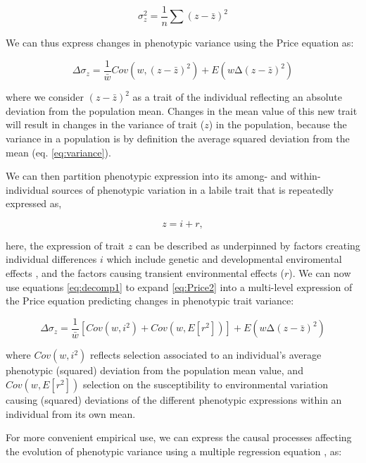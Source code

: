 \documentclass{article}
\begin{document}
\begin{equation} \label{eq:variance}
\sigma^{2}_{z} = \frac{1}{n} \sum{(z-\bar{z})^2}
\end{equation}

We can thus express changes in phenotypic variance using the Price equation \citep{Lehtonen2017} as:

\begin{equation} \label{eq:Price2}
\Delta \sigma_{z} = \frac{1}{\bar{w}} Cov(w,(z-\bar{z})^2)+E(w∆(z-\bar{z})^2)
\end{equation}

where we consider $(z-\bar{z})^2$ as a trait of the individual reflecting an absolute deviation from the population mean. Changes in the mean value of this new trait will result in changes in the variance of trait ($z$) in the population, because the variance in a population is by definition the average squared deviation from the mean (eq. \ref{eq:variance}).

We can then partition phenotypic expression into its among- and within-individual sources of phenotypic variation in a labile trait that is repeatedly expressed as, 

\begin{equation} 
	z=i + r, \label{eq:decomp1} 
\end{equation}

here, the expression of trait $z$ can be described as underpinned by factors creating individual differences $i$ which include genetic and developmental enviromental effects \citep{Falconer1996}, and the factors causing transient environmental effects ($r$). We can now use equations \ref{eq:decomp1} to expand \ref{eq:Price2} into a multi-level expression of the Price equation predicting changes in phenotypic trait variance:

\begin{equation} \label{eq:Price3}
\Delta \sigma_{z} = \frac{1}{\bar{w}} [Cov(w,i^2 )+Cov(w,E[r^2])]+E(w∆(z-\bar{z})^2)
\end{equation}

where $Cov(w,i^2)$ reflects selection associated to an individual’s average phenotypic (squared) deviation from the population mean value, and $Cov(w,E[r^2])$ selection on the susceptibility to environmental variation causing (squared) deviations of the different phenotypic expressions within an individual from its own mean.

For more convenient empirical use, we can express the causal processes affecting the evolution of phenotypic variance using a multiple regression equation \citep{Lande1983}, as:
\end{document}
